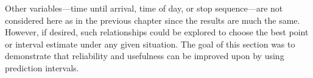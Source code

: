 Other variables---time until arrival, time of day, or stop sequence---are not considered here as in the previous chapter since the results are much the same. However, if desired, such relationships could be explored to choose the best point or interval estimate under any given situation. The goal of this section was to demonstrate that reliability and usefulness can be improved upon by using prediction intervals.
